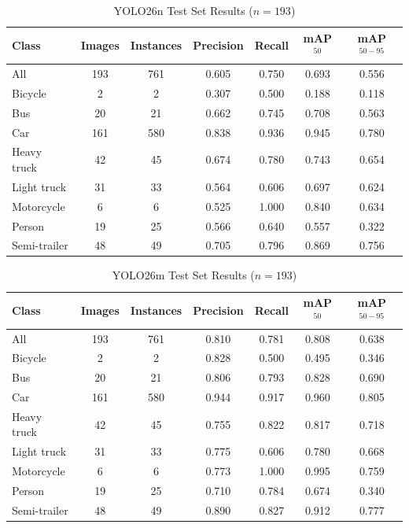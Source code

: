 \begin{table}[H]
\centering
\caption{YOLO26n Test Set Results ($n=193$)}
\label{tab:test_results_n}
\begin{tabular}{lcccccc}
\toprule
\textbf{Class} & \textbf{Images} & \textbf{Instances} & \textbf{Precision} & \textbf{Recall} & \textbf{mAP$^{50}$} & \textbf{mAP$^{50-95}$} \\
\midrule
All & 193 & 761 & 0.605 & 0.750 & 0.693 & 0.556 \\
\midrule
Bicycle & 2 & 2 & 0.307 & 0.500 & 0.188 & 0.118 \\
Bus & 20 & 21 & 0.662 & 0.745 & 0.708 & 0.563 \\
Car & 161 & 580 & 0.838 & 0.936 & 0.945 & 0.780 \\
Heavy truck & 42 & 45 & 0.674 & 0.780 & 0.743 & 0.654 \\
Light truck & 31 & 33 & 0.564 & 0.606 & 0.697 & 0.624 \\
Motorcycle & 6 & 6 & 0.525 & 1.000 & 0.840 & 0.634 \\
Person & 19 & 25 & 0.566 & 0.640 & 0.557 & 0.322 \\
Semi-trailer & 48 & 49 & 0.705 & 0.796 & 0.869 & 0.756 \\ \hline
\end{tabular}
\end{table}

\begin{table}[H]
\centering
\caption{YOLO26m Test Set Results ($n=193$)}
\label{tab:test_results_m}
\begin{tabular}{lcccccc}
\toprule
\textbf{Class} & \textbf{Images} & \textbf{Instances} & \textbf{Precision} & \textbf{Recall} & \textbf{mAP$^{50}$} & \textbf{mAP$^{50-95}$} \\
\midrule
All & 193 & 761 & 0.810 & 0.781 & 0.808 & 0.638 \\
\midrule
Bicycle & 2 & 2 & 0.828 & 0.500 & 0.495 & 0.346 \\
Bus & 20 & 21 & 0.806 & 0.793 & 0.828 & 0.690 \\
Car & 161 & 580 & 0.944 & 0.917 & 0.960 & 0.805 \\
Heavy truck & 42 & 45 & 0.755 & 0.822 & 0.817 & 0.718 \\
Light truck & 31 & 33 & 0.775 & 0.606 & 0.780 & 0.668 \\
Motorcycle & 6 & 6 & 0.773 & 1.000 & 0.995 & 0.759 \\
Person & 19 & 25 & 0.710 & 0.784 & 0.674 & 0.340 \\
Semi-trailer & 48 & 49 & 0.890 & 0.827 & 0.912 & 0.777 \\
\bottomrule
\end{tabular}
\end{table}

